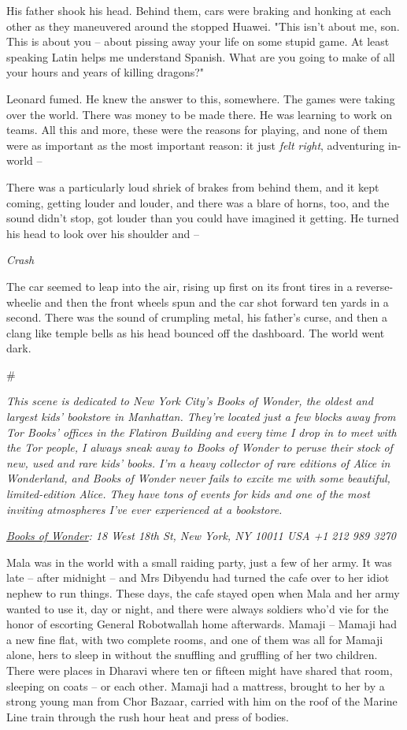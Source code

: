 His father shook his head. Behind them, cars were braking and
honking at each other as they maneuvered around the stopped Huawei.
"This isn't about me, son. This is about you -- about pissing away
your life on some stupid game. At least speaking Latin helps me
understand Spanish. What are you going to make of all your hours
and years of killing dragons?"

Leonard fumed. He knew the answer to this, somewhere. The games
were taking over the world. There was money to be made there. He
was learning to work on teams. All this and more, these were the
reasons for playing, and none of them were as important as the most
important reason: it just \emph{felt right}, adventuring in-world
--

There was a particularly loud shriek of brakes from behind them,
and it kept coming, getting louder and louder, and there was a
blare of horns, too, and the sound didn't stop, got louder than you
could have imagined it getting. He turned his head to look over his
shoulder and --

\emph{Crash}

The car seemed to leap into the air, rising up first on its front
tires in a reverse-wheelie and then the front wheels spun and the
car shot forward ten yards in a second. There was the sound of
crumpling metal, his father's curse, and then a clang like temple
bells as his head bounced off the dashboard. The world went dark.

\#

\emph{This scene is dedicated to New York City's Books of Wonder, the oldest and largest kids' bookstore in Manhattan. They're located just a few blocks away from Tor Books' offices in the Flatiron Building and every time I drop in to meet with the Tor people, I always sneak away to Books of Wonder to peruse their stock of new, used and rare kids' books. I'm a heavy collector of rare editions of Alice in Wonderland, and Books of Wonder never fails to excite me with some beautiful, limited-edition Alice. They have tons of events for kids and one of the most inviting atmospheres I've ever experienced at a bookstore.}

\emph{\href{http://www.booksofwonder.com/}{Books of Wonder}: 18 West 18th St, New York, NY 10011 USA +1 212 989 3270}

Mala was in the world with a small raiding party, just a few of her
army. It was late -- after midnight -- and Mrs Dibyendu had turned
the cafe over to her idiot nephew to run things. These days, the
cafe stayed open when Mala and her army wanted to use it, day or
night, and there were always soldiers who'd vie for the honor of
escorting General Robotwallah home afterwards. Mamaji -- Mamaji had
a new fine flat, with two complete rooms, and one of them was all
for Mamaji alone, hers to sleep in without the snuffling and
gruffling of her two children. There were places in Dharavi where
ten or fifteen might have shared that room, sleeping on coats -- or
each other. Mamaji had a mattress, brought to her by a strong young
man from Chor Bazaar, carried with him on the roof of the Marine
Line train through the rush hour heat and press of bodies.

